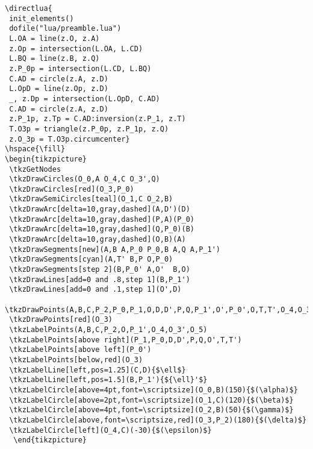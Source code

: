 \begin{verbatim}
\directlua{
 init_elements()
 dofile("lua/preamble.lua")
 L.OA = line(z.O, z.A)
 z.Op = intersection(L.OA, L.CD)
 L.BQ = line(z.B, z.Q)
 z.P_0p = intersection(L.CD, L.BQ)
 C.AD = circle(z.A, z.D)
 L.OpD = line(z.Op, z.D)
 _, z.Dp = intersection(L.OpD, C.AD)
 C.AD = circle(z.A, z.D)
 z.P_1p, z.Tp = C.AD:inversion(z.P_1, z.T)
 T.O3p = triangle(z.P_0p, z.P_1p, z.Q)
 z.O_3p = T.O3p.circumcenter}
\hspace{\fill}
\begin{tikzpicture}
 \tkzGetNodes
 \tkzDrawCircles(O_0,A O_4,C O_3',Q)
 \tkzDrawCircles[red](O_3,P_0)
 \tkzDrawSemiCircles[teal](O_1,C O_2,B)
 \tkzDrawArc[delta=10,gray,dashed](A,D')(D)
 \tkzDrawArc[delta=10,gray,dashed](P,A)(P_0)
 \tkzDrawArc[delta=10,gray,dashed](Q,P_0)(B)
 \tkzDrawArc[delta=10,gray,dashed](O,B)(A)
 \tkzDrawSegments[new](A,B A,P_0 P_0,B A,Q A,P_1')
 \tkzDrawSegments[cyan](A,T' B,P O,P_0)
 \tkzDrawSegments[step 2](B,P_0' A,O'  B,O)
 \tkzDrawLines[add=0 and .8,step 1](B,P_1')
 \tkzDrawLines[add=0 and .1,step 1](O',D)
 \tkzDrawPoints(A,B,C,P_2,P_0,P_1,O,D,D',P,Q,P_1',O',P_0',O,T,T',O_4,O_3',O_5)
 \tkzDrawPoints[red](O_3)
 \tkzLabelPoints(A,B,C,P_2,O,P_1',O_4,O_3',O_5)
 \tkzLabelPoints[above right](P_1,P_0,D,D',P,Q,O',T,T')
 \tkzLabelPoints[above left](P_0')
 \tkzLabelPoints[below,red](O_3)
 \tkzLabelLine[left,pos=1.25](C,D){$\ell$}
 \tkzLabelLine[left,pos=1.5](B,P_1'){${\ell}'$}
 \tkzLabelCircle[above=4pt,font=\scriptsize](O_0,B)(150){$(\alpha)$}
 \tkzLabelCircle[above=2pt,font=\scriptsize](O_1,C)(120){$(\beta)$}
 \tkzLabelCircle[above=4pt,font=\scriptsize](O_2,B)(50){$(\gamma)$}
 \tkzLabelCircle[above,font=\scriptsize,red](O_3,P_2)(180){$(\delta)$}
 \tkzLabelCircle[left](O_4,C)(-30){$(\epsilon)$}
  \end{tikzpicture}
\end{verbatim}


